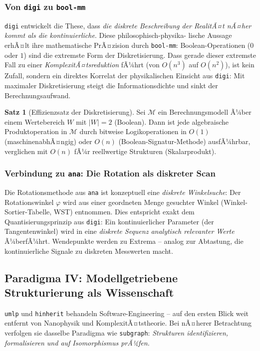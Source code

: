 ﻿\documentclass[a4paper,12pt]{scrreprt}
\theoremstyle{definition}
\newtheorem{satz}{Satz}[section]
\begin{document}
\subsubsection{Von \texttt{digi} zu \texttt{bool-mm}}

\texttt{digi} entwickelt die These, dass \emph{die diskrete Beschreibung
der RealitÃ¤t nÃ¤her kommt als die kontinuierliche}. Diese philosophisch-physika-
lische Aussage erhÃ¤lt ihre mathematische PrÃ¤zision durch \texttt{bool-mm}:
Boolean-Operationen ($0$ oder $1$) sind die extremste Form der Diskretisierung.
Dass gerade dieser extremste Fall zu einer \emph{KomplexitÃ¤tsreduktion} fÃ¼hrt
(von $O(n^3)$ auf $O(n^2)$), ist kein Zufall, sondern ein direktes
Korrelat der physikalischen Einsicht aus \texttt{digi}: Mit maximaler Diskretisierung
steigt die Informationsdichte und sinkt der Berechnungsaufwand.

\begin{satz}[Effizienzsatz der Diskretisierung]
  Sei $\mathcal{M}$ ein Berechnungsmodell Ã¼ber einem Wertebereich $W$ mit
  $|W|=2$ (Boolean). Dann ist jede algebraische Produktoperation in $\mathcal{M}$
  durch bitweise Logikoperationen in $O(1)$ (maschinenabhÃ¤ngig) oder $O(n)$
  (Boolean-Signatur-Methode) ausfÃ¼hrbar, verglichen mit $O(n)$ fÃ¼r reellwertige
  Strukturen (Skalarprodukt).
\end{satz}

\subsubsection{Verbindung zu \texttt{ana}: Die Rotation als diskreter Scan}

Die Rotationsmethode aus \texttt{ana} ist konzeptuell eine \emph{diskrete
Winkelsuche}: Der Rotationswinkel $\varphi$ wird aus einer geordneten Menge
gesuchter Winkel (Winkel-Sortier-Tabelle, WST) entnommen. Dies entspricht
exakt dem Quantisierungsprinzip aus \texttt{digi}: Ein kontinuierlicher
Parameter (der Tangentenwinkel) wird in eine \emph{diskrete Sequenz
analytisch relevanter Werte} Ã¼berfÃ¼hrt. Wendepunkte werden zu Extrema --
analog zur Abtastung, die kontinuierliche Signale zu diskreten Messwerten macht.

\subsection{Paradigma IV: Modellgetriebene Strukturierung als Wissenschaft}
\label{ssec:paradigma4}

\texttt{umlp} und \texttt{hinherit} behandeln Software-Engineering -- auf
den ersten Blick weit entfernt von Nanophysik und KomplexitÃ¤tstheorie.
Bei nÃ¤herer Betrachtung verfolgen sie dasselbe Paradigma wie \texttt{subgraph}:
\emph{Strukturen identifizieren, formalisieren und auf Isomorphismus prÃ¼fen.}
\end{document}
